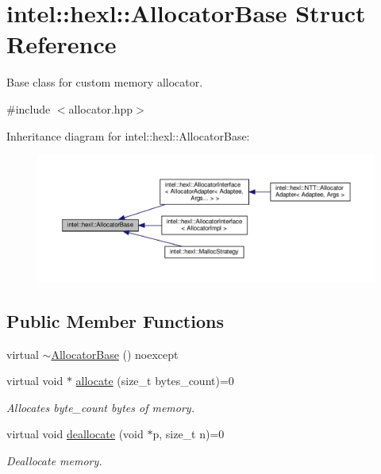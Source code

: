 \hypertarget{structintel_1_1hexl_1_1AllocatorBase}{}\section{intel\+:\+:hexl\+:\+:Allocator\+Base Struct Reference}
\label{structintel_1_1hexl_1_1AllocatorBase}


Base class for custom memory allocator.  




{\ttfamily \#include $<$allocator.\+hpp$>$}



Inheritance diagram for intel\+:\+:hexl\+:\+:Allocator\+Base\+:
\nopagebreak
\begin{figure}[H]
\begin{center}
\leavevmode
\includegraphics[width=350pt]{structintel_1_1hexl_1_1AllocatorBase__inherit__graph}
\end{center}
\end{figure}
\subsection*{Public Member Functions}
\begin{DoxyCompactItemize}
\item 
virtual \hyperlink{structintel_1_1hexl_1_1AllocatorBase_ac8a2afdc70cef8b7c9342aa2281ea4d5}{$\sim$\+Allocator\+Base} () noexcept
\item 
virtual void $\ast$ \hyperlink{structintel_1_1hexl_1_1AllocatorBase_aadf587e7617fbace2e9d3b4f9d9e8af0}{allocate} (size\+\_\+t bytes\+\_\+count)=0
\begin{DoxyCompactList}\small\item\em Allocates byte\+\_\+count bytes of memory. \end{DoxyCompactList}\item 
virtual void \hyperlink{structintel_1_1hexl_1_1AllocatorBase_a0f03686f9b78728d4d228ceaf4c2948e}{deallocate} (void $\ast$p, size\+\_\+t n)=0
\begin{DoxyCompactList}\small\item\em Deallocate memory. \end{DoxyCompactList}\end{DoxyCompactItemize}


